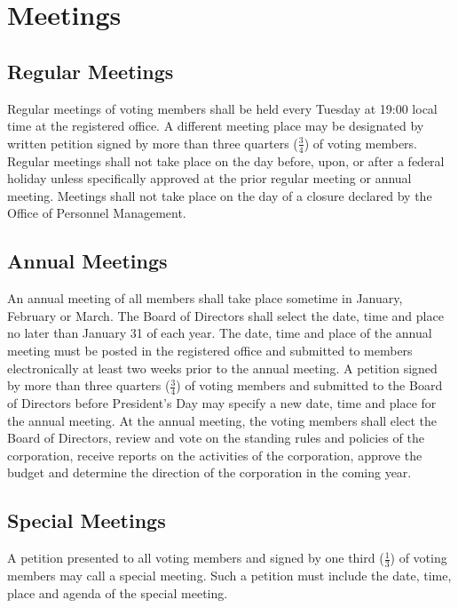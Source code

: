 \documentclass[10pt,letterpaper,titlepage]{article}
\begin{document}
\section{Meetings}

\subsection{Regular Meetings}

Regular meetings of voting members shall be held every Tuesday at 19:00 local
time at the registered office.
A different meeting place may be designated by written petition signed by more
than three quarters ($\frac{3}{4}$) of voting members.
Regular meetings shall not take place on the day before, upon, or after a
federal holiday unless specifically approved at the prior regular meeting or
annual meeting.
Meetings shall not take place on the day of a closure declared by the Office of
Personnel Management.

\subsection{Annual Meetings}

An annual meeting of all members shall take place sometime in January, February
or March.
The Board of Directors shall select the date, time and place no later than
January 31 of each year.
The date, time and place of the annual meeting must be posted in the registered
office and submitted to members electronically at least two weeks prior to the
annual meeting.
A petition signed by more than three quarters ($\frac{3}{4}$) of voting members
and submitted to the Board of Directors before President’s Day may specify a
new date, time and place for the annual meeting.
At the annual meeting, the voting members shall elect the Board of Directors,
review and vote on the standing rules and policies of the corporation, receive
reports on the activities of the corporation, approve the budget and determine
the direction of the corporation in the coming year.

\subsection{Special Meetings}
\label{specialmeet}

A petition presented to all voting members and signed by one third
($\frac{1}{3}$) of voting members may call a special meeting.
Such a petition must include the date, time, place and agenda of the special
meeting.
\end{document}
